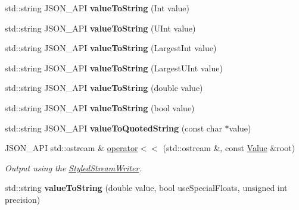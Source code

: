 \begin{DoxyCompactItemize}
\mbox{\label{namespace_json_a5d3eba6789f9a9c1ab563ff8b4a5090f}} 
std\+::string J\+S\+O\+N\+\_\+\+A\+PI {\bfseries value\+To\+String} (Int value)
\item 
\mbox{\label{namespace_json_a4d43b0ff222bd3975bcf1babca0b978f}} 
std\+::string J\+S\+O\+N\+\_\+\+A\+PI {\bfseries value\+To\+String} (U\+Int value)
\item 
\mbox{\label{namespace_json_abd9c650f70d9434f98f9025e2e2faf2d}} 
std\+::string J\+S\+O\+N\+\_\+\+A\+PI {\bfseries value\+To\+String} (Largest\+Int value)
\item 
\mbox{\label{namespace_json_a3f46b0bc62b95a9426a2da0117bdf9f0}} 
std\+::string J\+S\+O\+N\+\_\+\+A\+PI {\bfseries value\+To\+String} (Largest\+U\+Int value)
\item 
\mbox{\label{namespace_json_a99995d7dafa4f4970b349d7d3c8d1d99}} 
std\+::string J\+S\+O\+N\+\_\+\+A\+PI {\bfseries value\+To\+String} (double value)
\item 
\mbox{\label{namespace_json_a979ed531f091985e22f0051cd2a8e341}} 
std\+::string J\+S\+O\+N\+\_\+\+A\+PI {\bfseries value\+To\+String} (bool value)
\item 
\mbox{\label{namespace_json_aa0c8235a4a5c6599da5d3332743db8ac}} 
std\+::string J\+S\+O\+N\+\_\+\+A\+PI {\bfseries value\+To\+Quoted\+String} (const char $\ast$value)
\item 
J\+S\+O\+N\+\_\+\+A\+PI std\+::ostream \& \hyperlink{namespace_json_a87bc83d7e90fc666d28aa16727deda2f}{operator$<$$<$} (std\+::ostream \&, const \hyperlink{class_json_1_1_value}{Value} \&root)
\begin{DoxyCompactList}\small\item\em Output using the \hyperlink{class_json_1_1_styled_stream_writer}{Styled\+Stream\+Writer}. \end{DoxyCompactList}\item 
\mbox{\label{namespace_json_a1c49ced79060a67638d7fa78a63b1813}} 
std\+::string {\bfseries value\+To\+String} (double value, bool use\+Special\+Floats, unsigned int precision)
\end{DoxyCompactItemize}
